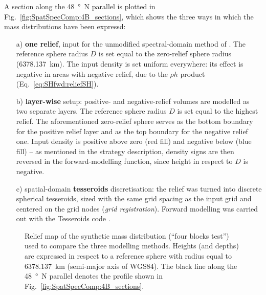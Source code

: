 \begin{subappendices}
A section along the \SI{48}{\degree N} parallel is plotted in Fig.~\ref{fig:SpatSpecComp:4B_sections}, which shows the three ways in which the mass distributions have been expressd:
\begin{enumerate}
\item[a)] \textbf{one relief}, input for the unmodified spectral-domain method of \textcite{Wieczorek2007}. The reference sphere radius $D$ is set equal to the zero-relief sphere radius (\SI{6378.137}{\kilo \metre}). The input density is set uniform everywhere: its effect is negative in areas with negative relief, due to the $\rho h$ product (Eq.~\ref{eq:SHfwd:reliefSH}).
\item[b)] \textbf{layer-wise} setup: positive- and negative-relief volumes are modelled as two separate layers. The reference sphere radius $D$ is set equal to the highest relief. The aforementioned zero-relief sphere serves as the bottom boundary for the positive relief layer and as the top boundary for the negative relief one. Input density is positive above zero (red fill) and negative below (blue fill) -- as mentioned in the strategy description, density signs are then reversed in the forward-modelling function, since height in respect to $D$ is negative.
\item[c)] spatial-domain \textbf{tesseroids} discretisation: the relief was turned into discrete spherical tesseroids, sized with the same grid spacing as the input grid and centered on the grid nodes (\textit{grid registration}). Forward modelling was carried out with the Tesseroids code \parencites{Uieda2016}{UiedaTesseroids}.
\end{enumerate}

\begin{figure} %
    \begin{adjustbox}{center}
    \end{adjustbox}
    \caption[Relief map of the synthetic mass distribution used to compare the three modelling methods.]{
        Relief map of the synthetic mass distribution (``four blocks test'') used to compare the three modelling methods.
        Heights (and depths) are expressed in respect to a reference sphere with radius equal to \SI{6378.137}{\kilo \metre} (semi-major axis of {WGS84}).
        The black line along the \SI{48}{\degree N} parallel denotes the profile shown in Fig.~\ref{fig:SpatSpecComp:4B_sections}.}
    \label{fig:SpatSpecComp:4B_DepthMap}
\end{figure}


\end{subappendices}
